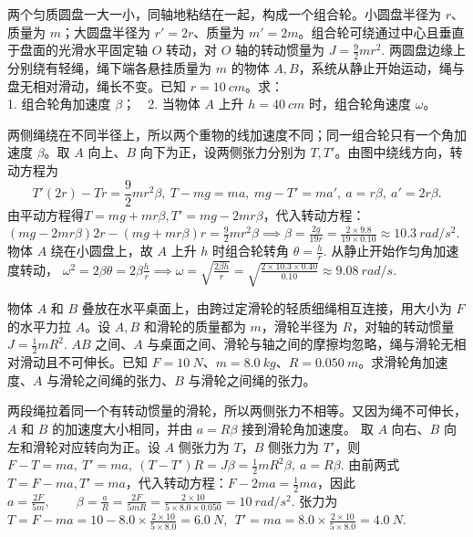 \documentclass[lang=cn,11pt]{elegantbook}
\begin{document}
\begin{exercise}
两个匀质圆盘一大一小，同轴地粘结在一起，构成一个组合轮。小圆盘半径为 \(r\)、质量为 \(m\)；大圆盘半径为 \(r'=2r\)、质量为 \(m'=2m\)。组合轮可绕通过中心且垂直于盘面的光滑水平固定轴 \(O\) 转动，对 \(O\) 轴的转动惯量为
 \(J=\frac{9}{2}mr^2.\) 
两圆盘边缘上分别绕有轻绳，绳下端各悬挂质量为 \(m\) 的物体 \(A,B\)，系统从静止开始运动，绳与盘无相对滑动，绳长不变。已知 \(r=\SI{10}{cm}\)。求：\\
1. 组合轮角加速度 \(\beta\)；~~2. 当物体 \(A\) 上升 \(h=\SI{40}{cm}\) 时，组合轮角速度 \(\omega\)。
\end{exercise}
\begin{solution}
两侧绳绕在不同半径上，所以两个重物的线加速度不同；同一组合轮只有一个角加速度 \(\beta\)。取 \(A\) 向上、\(B\) 向下为正，设两侧张力分别为 \(T,T'\)。由图中绕线方向，转动方程为
\[
T'(2r)-Tr=\frac{9}{2}mr^2\beta,~T-mg=ma,~mg-T'=ma',~a=r\beta,~a'=2r\beta.
\]
由平动方程得$T=mg+mr\beta,T'=mg-2mr\beta$，代入转动方程：
 \((mg-2mr\beta)2r-(mg+mr\beta)r =\frac{9}{2}mr^2\beta \implies \beta=\frac{2g}{19r}=\frac{2\times9.8}{19\times0.10} \approx \SI{10.3}{rad/s^2}.\) 
物体 \(A\) 绕在小圆盘上，故 \(A\) 上升 \(h\) 时组合轮转角
 \(\theta=\frac{h}{r}.\) 
从静止开始作匀角加速度转动，
 \(\omega^2=2\beta\theta=2\beta\frac{h}{r}\implies \omega=\sqrt{\frac{2\beta h}{r}} =\sqrt{\frac{2\times10.3\times0.40}{0.10}} \approx \SI{9.08}{rad/s}.\) 
\end{solution}

\begin{exercise}
物体 \(A\) 和 \(B\) 叠放在水平桌面上，由跨过定滑轮的轻质细绳相互连接，用大小为 \(F\) 的水平力拉 \(A\)。设 \(A,B\) 和滑轮的质量都为 \(m\)，滑轮半径为 \(R\)，对轴的转动惯量
 \(J=\frac12mR^2.\) 
\(AB\) 之间、\(A\) 与桌面之间、滑轮与轴之间的摩擦均忽略，绳与滑轮无相对滑动且不可伸长。已知 \(F=\SI{10}{N}\)、\(m=\SI{8.0}{kg}\)、\(R=\SI{0.050}{m}\)。求滑轮角加速度、\(A\) 与滑轮之间绳的张力、\(B\) 与滑轮之间绳的张力。
\end{exercise}
\begin{solution}
两段绳拉着同一个有转动惯量的滑轮，所以两侧张力不相等。又因为绳不可伸长，\(A\) 和 \(B\) 的加速度大小相同，并由 \(a=R\beta\) 接到滑轮角加速度。
 取 \(A\) 向右、\(B\) 向左和滑轮对应转向为正。设 \(A\) 侧张力为 \(T\)，\(B\) 侧张力为 \(T'\)，则
 \(F-T=ma,~ T'=ma,~ (T-T')R=J\beta=\frac12mR^2\beta,~ a=R\beta.\) 
由前两式$T=F-ma, T'=ma$，代入转动方程：$F-2ma=\frac12m a$，因此
 \(a=\frac{2F}{5m},\qquad \beta=\frac{a}{R}=\frac{2F}{5mR}=\frac{2\times10}{5\times8.0\times0.050} =\SI{10}{rad/s^2}.\) 
张力为
 \(T=F-ma=10-8.0\times\frac{2\times10}{5\times8.0} =\SI{6.0}{N},~~ T'=ma=8.0\times\frac{2\times10}{5\times8.0} =\SI{4.0}{N}.\) 
\end{solution}
\end{document}

